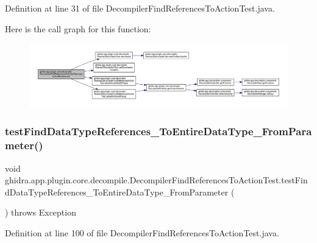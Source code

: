 Definition at line 31 of file Decompiler\+Find\+References\+To\+Action\+Test.\+java.

Here is the call graph for this function\+:
\nopagebreak
\begin{figure}[H]
\begin{center}
\leavevmode
\includegraphics[width=350pt]{classghidra_1_1app_1_1plugin_1_1core_1_1decompile_1_1_decompiler_find_references_to_action_test_a5bc700e25fe553a7fa90b649eb628364_cgraph}
\end{center}
\end{figure}
\mbox{\label{classghidra_1_1app_1_1plugin_1_1core_1_1decompile_1_1_decompiler_find_references_to_action_test_abcbf2eac0b6b0916b549a6cd1b487dc0}} 
\subsubsection{\texorpdfstring{testFindDataTypeReferences\_ToEntireDataType\_FromParameter()}{testFindDataTypeReferences\_ToEntireDataType\_FromParameter()}}
{\footnotesize\ttfamily void ghidra.\+app.\+plugin.\+core.\+decompile.\+Decompiler\+Find\+References\+To\+Action\+Test.\+test\+Find\+Data\+Type\+References\+\_\+\+To\+Entire\+Data\+Type\+\_\+\+From\+Parameter (\begin{DoxyParamCaption}{ }\end{DoxyParamCaption}) throws Exception\hspace{0.3cm}{\ttfamily [inline]}}



Definition at line 100 of file Decompiler\+Find\+References\+To\+Action\+Test.\+java.

